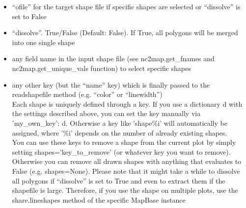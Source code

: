 \begin{description}
\begin{itemize}
\begin{itemize}
        \item \enquote{ofile} for the target shape file if specific shapes are selected or \enquote{dissolve} is set to False
        \item \enquote{dissolve}. True/False (Default: False). If True, all polygons will be merged into one single shape
        \item any field name in the input shape file (see nc2map.get\_fnames and nc2map.get\_unique\_vals function) to select specific shapes
        \item any other key (but the \enquote{name} key) which is finally passed to the readshapefile method (e.g. \enquote{color} or \enquote{linewidth})\\
 Each shape is uniquely defined through a key. If you use a dictionary d with the settings described above, you can set the key manually via {'my\_own\_key': d}. Otherwise a key like 'shape\%i' will automatically be assigned, where '\%i' depends on the number of already existing shapes.\\
 You can use these keys to remove a shape from the current plot by simply setting shapes='key\_to\_remove' (or whatever key you want to remove). Otherwise you can remove all drawn shapes with anything that evaluates to False (e.g. shapes=None). Please note that it might take a while to dissolve all polygons if \enquote{dissolve} is set to True and even to extract them if the shapefile is large. Therefore, if you use the shape on multiple plots, use the share.lineshapes method of the specific MapBase instance
\end{itemize}
\end{itemize}



\end{description}
